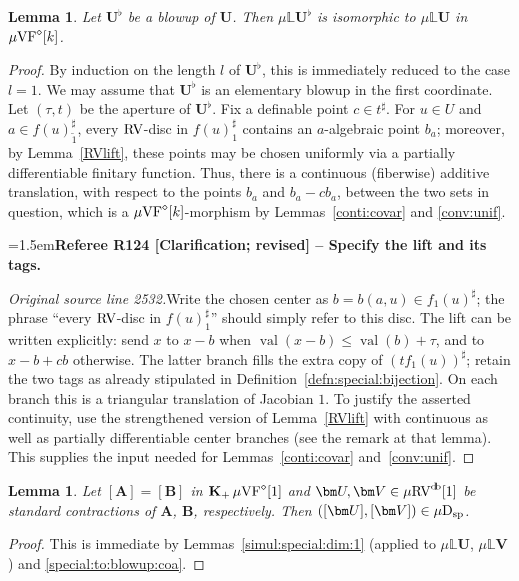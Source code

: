 \documentclass[12pt]{amsart}
\newcommand{\RefereeRemark}[4]{%
  \par\medskip\begingroup\normalfont\small\color{RefereePurple}%
  \emergencystretch=1.5em\noindent\textbf{Referee R#1 [#2] -- #3.}\par\nobreak\noindent #4\par
  \endgroup\medskip
}
\theoremstyle{plain}
\newtheorem{lem}[thm]{Lemma}
\theoremstyle{definition}
\theoremstyle{remark}
\numberwithin{equation}{section}
\theoremstyle{plain}
\newcommand{\VF}{\textup{VF}}
\newcommand{\RV}{\textup{RV}}
\newcommand{\0}{\emptyset}
\newcommand{\bb}[1]{\mathbb{#1}}
\newcommand{\mVF}{{\mu}{\VF}}
\newcommand{\mRV}{{\mu}{\RV}}
\newcommand{\dsp}{\textup{D}_{\textup{sp}}}
\newcommand{\mispdb}{\mu \dsp}
\newcommand{\mL}{{\mu}{\bb L}}
\DeclareMathOperator{\vv}{val}
\DeclareMathOperator{\gsk}{\mathbf{K}_+}
\DeclareMathOperator{\db}{d \! b}
\begin{document}
\begin{lem}\label{blowup:same:RV:coa}
Let $\bm U^{\flat}$ be a blowup of $\bm U$. Then $\mL \bm U^{\flat}$ is isomorphic to $\mL \bm U$ in $\mVF^{\diamond}[k]$.
\end{lem}
\begin{proof}
By induction on the length $l$ of $\bm U^{\flat}$, this is immediately reduced to the case $l=1$. We may assume that $\bm U^{\flat}$ is an elementary blowup in the first coordinate. Let $(\tau, t)$ be the aperture of $\bm U^{\flat}$. Fix a definable point $c \in t^\sharp$. For $u \in U$ and $a \in  f(u)_{\tilde 1}^\sharp$, every $\RV$-disc in $f(u)_{1}^\sharp$ contains an $a$-algebraic point $b_a$; moreover, by Lemma~\ref{RVlift}, these points may be chosen uniformly via a partially differentiable finitary function. Thus, there is a continuous (fiberwise) additive translation, with respect to the points $b_a$ and $b_a - c b_a$, between the two sets in question, which is a $\mVF^{\diamond}[k]$-morphism by Lemmas~\ref{conti:covar} and \ref{conv:unif}.

\RefereeRemark{124}{Clarification; revised}{Specify the lift and its tags}{%
\textit{Original source line 2532.}\quad Write the chosen center as $b=b(a,u)\in f_1(u)^\sharp$; the phrase ``every $\RV$-disc in $f(u)_1^\sharp$'' should simply refer to this disc. The lift can be written explicitly: send $x$ to $x-b$ when $\vv(x-b)\leq\vv(b)+\tau$, and to $x-b+cb$ otherwise. The latter branch fills the extra copy of $(tf_1(u))^\sharp$; retain the two tags as already stipulated in Definition~\ref{defn:special:bijection}. On each branch this is a triangular translation of Jacobian $1$. To justify the asserted continuity, use the strengthened version of Lemma~\ref{RVlift} with continuous as well as partially differentiable center branches (see the remark at that lemma). This supplies the input needed for Lemmas~\ref{conti:covar} and~\ref{conv:unif}.
}
\end{proof}



\begin{lem}\label{kernel:dim:1:coa}
Let $[\bm A] = [\bm B]$ in  $\gsk \mVF^{\diamond}[1]$ and $\bm U, \bm V \in \mRV^{\db}[1]$ be standard contractions of $\bm A$, $\bm B$, respectively. Then $([\bm U], [\bm V]) \in \mispdb$.
\end{lem}
\begin{proof}
This is immediate by Lemmas~\ref{simul:special:dim:1} (applied to $\mL \bm U$, $\mL \bm V$) and \ref{special:to:blowup:coa}.
\end{proof}
\end{document}
